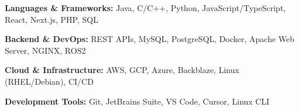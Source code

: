 
\textbf{Languages \& Frameworks:} Java, C/C++, Python, JavaScript/TypeScript, React, Next.js, PHP, SQL

\textbf{Backend \& DevOps:} REST APIs, MySQL, PostgreSQL, Docker, Apache Web Server, NGINX, ROS2

\textbf{Cloud \& Infrastructure:} AWS, GCP, Azure, Backblaze, Linux (RHEL/Debian), CI/CD

\textbf{Development Tools:} Git, JetBrains Suite, VS Code, Cursor, Linux CLI 
